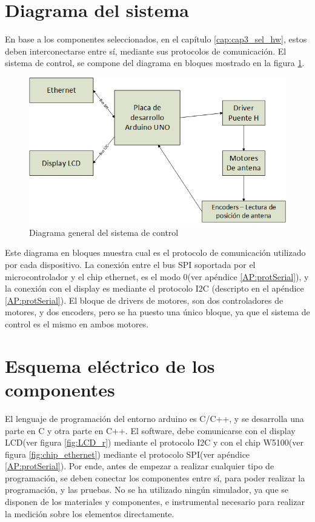 \section{Diagrama del sistema} 

En base a los componentes seleccionados, en el capítulo \ref{cap:cap3_sel_hw}, estos deben interconectarse entre sí, mediante sus protocolos de comunicación. El sistema de control, se compone del diagrama en bloques mostrado en la figura \ref{fig:sistema_general}.  
\begin{figure}[ht]
	\hspace{-15mm}
	\includegraphics{sistema_general} 
	\caption{Diagrama general del sistema de control} 
	\label{fig:sistema_general}
\end{figure}

Este diagrama en bloques muestra cual es el protocolo de comunicación utilizado por cada dispositivo. La conexión entre el bus SPI soportada por el microcontrolador y el chip ethernet, es el modo 0(ver apéndice \ref{AP:protSerial}), y la conexión con el display es mediante el protocolo I2C (descripto en el apéndice \ref{AP:protSerial}). El bloque de drivers de motores, son dos controladores de motores, y dos encoders, pero se ha puesto una único bloque, ya que el sistema de control es el mismo en ambos motores. 

\section{Esquema eléctrico de los componentes}
El lenguaje de programación del entorno arduino es C/C++, y se desarrolla una parte en C y otra parte en C++. El software, debe comunicarse con el display LCD(ver figura \ref{fig:LCD_r}) mediante el protocolo I2C y con el chip W5100(ver figura \ref{fig:chip_ethernet}) mediante el protocolo SPI(ver apéndice \ref{AP:protSerial}). Por ende, antes de empezar a realizar cualquier tipo de programación, se deben conectar los componentes entre sí, para poder realizar la programación, y las pruebas. No se ha utilizado ningún simulador, ya que se disponen de los materiales y componentes, e instrumental necesario para realizar la medición sobre los elementos directamente.  


